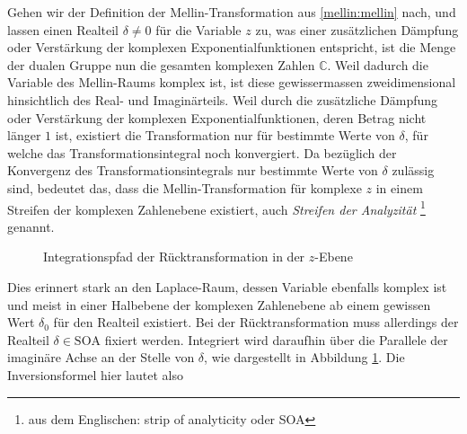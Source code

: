 Gehen wir der Definition der Mellin-Transformation aus 
\eqref{mellin:mellin} nach, und lassen einen Realteil $\delta \neq 0$ für 
die Variable $z$ zu, was einer zusätzlichen Dämpfung oder Verstärkung der 
komplexen Exponentialfunktionen entspricht, ist die Menge der dualen 
Gruppe nun die gesamten komplexen Zahlen $\mathbb{C}$.
Weil dadurch die Variable des Mellin-Raums komplex ist, ist diese 
gewissermassen zweidimensional hinsichtlich des Real- und Imaginärteils. 
Weil durch die zusätzliche Dämpfung oder Verstärkung der komplexen 
Exponentialfunktionen, deren Betrag nicht länger $1$ ist, existiert die 
Transformation nur für bestimmte Werte von $\delta$, für welche das 
Transformationsintegral noch konvergiert.
Da bezüglich der Konvergenz des Transformationsintegrals nur bestimmte 
Werte von $\delta$ zulässig sind, bedeutet das, dass die 
Mellin-Transformation für komplexe $z$ in einem Streifen der komplexen 
Zahlenebene existiert, auch {\em Streifen der Analyzität}
\footnote{aus dem Englischen: strip of analyticity oder SOA} genannt.
\begin{figure}
    \centering
    \caption{Integrationspfad der Rücktransformation in der $z$-Ebene
    \label{fig:mellin:z}}
\end{figure}
Dies erinnert stark an den Laplace-Raum, dessen Variable ebenfalls komplex 
ist und meist in einer Halbebene der komplexen Zahlenebene ab einem 
gewissen Wert $\delta_0$ für den Realteil existiert.
Bei der Rücktransformation muss allerdings der Realteil 
$\delta \in \text{SOA}$ fixiert werden. 
Integriert wird daraufhin über die Parallele der imaginäre Achse an der 
Stelle von $\delta$, wie dargestellt in Abbildung \ref{fig:mellin:z}.
Die Inversionsformel hier lautet also

